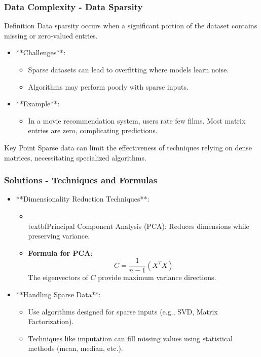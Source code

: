 \documentclass[aspectratio=169]{beamer}
\begin{document}
\begin{frame}[fragile]
    \frametitle{Data Complexity - Data Sparsity}
    \begin{block}{Definition}
        Data sparsity occurs when a significant portion of the dataset contains missing or zero-valued entries.
    \end{block}
    \begin{itemize}
        \item **Challenges**:
        \begin{itemize}
            \item Sparse datasets can lead to overfitting where models learn noise.
            \item Algorithms may perform poorly with sparse inputs.
        \end{itemize}
        \item **Example**:
        \begin{itemize}
            \item In a movie recommendation system, users rate few films. Most matrix entries are zero, complicating predictions.
        \end{itemize}
    \end{itemize}
    \begin{alertblock}{Key Point}
        Sparse data can limit the effectiveness of techniques relying on dense matrices, necessitating specialized algorithms.
    \end{alertblock}
\end{frame}

\begin{frame}[fragile]
    \frametitle{Solutions - Techniques and Formulas}
    \begin{itemize}
        \item **Dimensionality Reduction Techniques**:
        \begin{itemize}
            \item \\textbf{Principal Component Analysis (PCA)}: Reduces dimensions while preserving variance.
            \item \textbf{Formula for PCA}:
            \begin{equation}
            C = \frac{1}{n-1} (X^T X)
            \end{equation}
            The eigenvectors of \( C \) provide maximum variance directions.
        \end{itemize}
        \item **Handling Sparse Data**:
        \begin{itemize}
            \item Use algorithms designed for sparse inputs (e.g., SVD, Matrix Factorization).
            \item Techniques like imputation can fill missing values using statistical methods (mean, median, etc.).
        \end{itemize}
    \end{itemize}
\end{frame}
\end{document}
